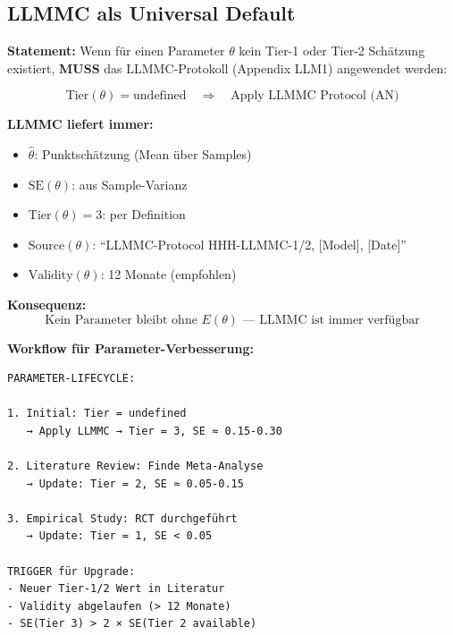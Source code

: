 \subsection{LLMMC als Universal Default}

\begin{tcolorbox}[colback=green!5!white, colframe=green!75!black,
    title=\textbf{Theorem EI-T1: LLMMC als Universal Default}]

\textbf{Statement:} Wenn für einen Parameter $\theta$ kein Tier-1 oder Tier-2 Schätzung existiert, \textbf{MUSS} das LLMMC-Protokoll (Appendix LLM1) angewendet werden:

\begin{equation}
\boxed{\text{Tier}(\theta) = \text{undefined} \quad \Rightarrow \quad \text{Apply LLMMC Protocol (AN)}}
\end{equation}

\textbf{LLMMC liefert immer:}
\begin{itemize}[nosep]
    \item $\hat{\theta}$: Punktschätzung (Mean über Samples)
    \item $\text{SE}(\theta)$: aus Sample-Varianz
    \item $\text{Tier}(\theta) = 3$: per Definition
    \item $\text{Source}(\theta)$: ``LLMMC-Protocol HHH-LLMMC-1/2, [Model], [Date]''
    \item $\text{Validity}(\theta)$: 12 Monate (empfohlen)
\end{itemize}

\textbf{Konsequenz:}
\begin{equation*}
\boxed{\text{Kein Parameter bleibt ohne } E(\theta) \text{ --- LLMMC ist immer verfügbar}}
\end{equation*}

\end{tcolorbox}

\begin{tcolorbox}[colback=orange!5!white, colframe=orange!75!black,
    title=\textbf{Upgrade-Pfad: Von Tier 3 zu Tier 1}]

\textbf{Workflow für Parameter-Verbesserung:}

\begin{verbatim}
PARAMETER-LIFECYCLE:

1. Initial: Tier = undefined
   → Apply LLMMC → Tier = 3, SE ≈ 0.15-0.30

2. Literature Review: Finde Meta-Analyse
   → Update: Tier = 2, SE ≈ 0.05-0.15

3. Empirical Study: RCT durchgeführt
   → Update: Tier = 1, SE < 0.05

TRIGGER für Upgrade:
- Neuer Tier-1/2 Wert in Literatur
- Validity abgelaufen (> 12 Monate)
- SE(Tier 3) > 2 × SE(Tier 2 available)
\end{verbatim}

\end{tcolorbox}

